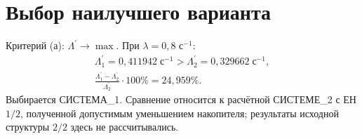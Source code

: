 \documentclass[12pt,a4paper]{article}
\begin{document}
\section{Выбор наилучшего варианта}
Критерий (а): $\Lambda^{\prime}\to\max$. При $\lambda=0{,}8$ с$^{-1}$:
\begin{gather}
\Lambda_1^{\prime}=0{,}411942\;\text{с}^{-1}>\Lambda_2^{\prime}=0{,}329662\;\text{с}^{-1},\\
\frac{\Lambda_1^{\prime}-\Lambda_2^{\prime}}{\Lambda_2^{\prime}}\cdot100\%=24{,}959\%.
\end{gather}
Выбирается СИСТЕМА\_1. Сравнение относится к расчётной СИСТЕМЕ\_2 с ЕН $1/2$, полученной допустимым уменьшением накопителя; результаты исходной структуры $2/2$ здесь не рассчитывались.
\end{document}
